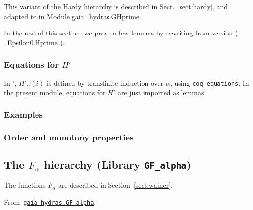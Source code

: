 This variant of the Hardy hierarchy is described in Sect.~\vref{sect:hardy}, and adapted to \gaia in
Module \href{../theories/html/gaia_hydras.GHprime.html}{gaia\_hydras.GHprime}.


In the rest of this section, we prove a few lemmas  by rewriting from \HydrasLib version ( ~\href{../theories/html/hydras.Epsilon0.Hprime.html}{Epsilon0.Hprime} ).

\subsubsection{Equations for $H'$}
In \HydrasLib', $H'_\alpha(i)$  is defined by transfinite induction over $\alpha$, using \texttt{coq-equations}. In the present module, equations for $H'$ are just imported as lemmas.


\subsubsection{Examples}


\subsubsection{Order and monotony properties}


\subsection{The \texorpdfstring{$F_\alpha$}{\texttt{F\_alpha}} hierarchy (Library \texttt{GF\_alpha})}

The functions $F_\alpha$ are described in Section~\vref{sect:wainer}. 


\vspace{4pt}

\noindent
From~\href{../theories/html/gaia_hydras.GF_alpha.html}%
{\texttt{gaia\_hydras.GF\_alpha}}.

